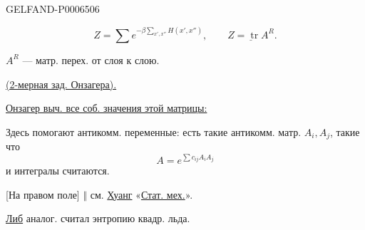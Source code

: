 \begin{GelfandAdjacentEvidence}{GELFAND-P000650}{6}

\[
Z=\sum e^{-\beta\sum_{x',x''}H(x',x'')},
\qquad \underline{Z=\operatorname{tr}A^R}.
\]
\end{GelfandAdjacentEvidence}

\(A^R\) --- матр. перех. от слоя к слою.

\underline{(2-мерная зад. Онзагера).}

\underline{Онзагер выч. все соб. значения этой матрицы:}

Здесь помогают антикомм. переменные: есть такие антикомм. матр. \(A_i,A_j\), такие что
\[
A=e^{\sum c_{ij}A_i A_j}
\]
и интегралы считаются.

[На правом поле] \(\Vert\) см. \underline{Хуанг} «\underline{Стат. мех.}».

\underline{Либ} аналог. считал энтропию квадр. льда.

\begin{center}\textemdash\enspace\textperiodcentered\enspace\textemdash\end{center}


